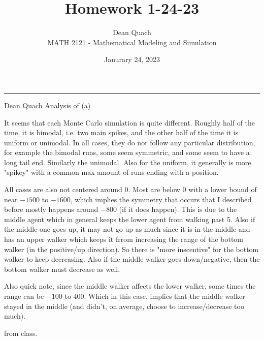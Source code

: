 \documentclass[12pt]{article}
\begin{document}
 
 
 
\title{Homework 1-24-23}%
\author{Dean Quach\\ %
MATH 2121 - Mathematical Modeling and Simulation} %
\date{Janurary 24, 2023}
\maketitle

\hrule
\vspace{20pt}



Dean Quach
Analysis of (a) 

It seems that each Monte Carlo simulation is quite different. Roughly half of the time, it is bimodal, i.e. two main spikes, and the 
other half of the time it is uniform or unimodal. In all cases, they do not follow any particular distribution, 
for example the bimodal runs, some seem symmetric, and some seem to have a long tail end. Similarly the unimodal. 
Also for the uniform, it generally is more "spikey" with a common max amount of runs ending with a position.

All cases are also not centered around 0. Most are below 0 with a lower bound of near $-1500$ to $-1600$, which 
implies the symmetry that occurs that I described before mostly happens around $-800$ (if it does happen). 
This is due to the middle agent which in general keeps the lower agent from walking past 5. Also if the middle one goes up, it may 
not go up as much since it is in the middle and has an upper walker which keeps it frrom increasing the range of the bottom walker 
(in the positive/up direction). So there is "more inscentive" for the bottom walker to keep decreasing. Also if the middle walker goes 
down/negative, then the bottom walker must decrease as well.

Also quick note, since the middle walker affects the lower walker, some times the range can be 
$-100$ to $400$. Which in this case, implies that the middle walker stayed in the middle (and didn't, on average, choose to 
increase/decrease too much).

from class.
\end{document}
